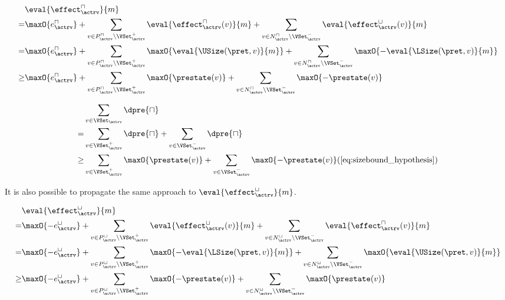 \begin{equation} \label{eq:input_rv_reduction_upper}
  \begin{split}
  & \eval{\effect^\sqcap_\actrv}{m} \\
  = & \maxO{e^{\sqcap}_\actrv}
    + \sum_{v \in P_\actrv^\sqcap \setminus \VSet^+_\actrv} \eval{\effect^\sqcap_\actrv(v)}{m}
    + \sum_{v \in N_\actrv^\sqcap \setminus \VSet^-_\actrv} \eval{\effect^\sqcup_\actrv(v)}{m} \\
  = & \maxO{e^{\sqcap}_\actrv}
    + \sum_{v \in P_\actrv^\sqcap \setminus \VSet^+_\actrv} \maxO{\eval{\USize(\pret, v)}{m}}
    + \sum_{v \in N_\actrv^\sqcap \setminus \VSet^-_\actrv} \maxO{-\eval{\LSize(\pret, v)}{m}} \\
  \geq & \maxO{e^{\sqcap}_\actrv}
    + \sum_{v \in P_\actrv^\sqcap \setminus \VSet^+_\actrv} \maxO{\prestate(v)}
    + \sum_{v \in N_\actrv^\sqcap \setminus \VSet^-_\actrv} \maxO{-\prestate(v)} \\
  \end{split}
\end{equation}

\begin{equation} \label{eq:d_upper_reduction}
  \begin{split} 
  & \sum_{v \in \VSet_\actrv} \dpre{\sqcap} \\
  = & \sum_{v \in \VSet^+_\actrv} \dpre{\sqcap} + \sum_{v \in \VSet^-_\actrv} \dpre{\sqcap} \\
  \geq & \sum_{v \in \VSet^+_\actrv} \maxO{\prestate(v)} + \sum_{v \in \VSet^-_\actrv} \maxO{-\prestate(v)} (\ref{eq:sizebound_hypothesis}) \\
  \end{split}      
\end{equation}

It is also possible to propagate the same approach to $\eval{\effect^\sqcup_\actrv}{m}$.

\begin{equation} \label{eq:input_rv_reduction_lower}
  \begin{split}
  & \eval{\effect^\sqcup_\actrv}{m} \\
  = & \maxO{-e^{\sqcup}_\actrv}
    + \sum_{v \in P_\actrv^\sqcup \setminus \VSet^+_\actrv} \eval{\effect^\sqcup_\actrv(v)}{m}
    + \sum_{v \in N_\actrv^\sqcup \setminus \VSet^-_\actrv} \eval{\effect^\sqcap_\actrv(v)}{m} \\
  = & \maxO{-e^{\sqcup}_\actrv}
    + \sum_{v \in P_\actrv^\sqcup \setminus \VSet^+_\actrv} \maxO{-\eval{\LSize(\pret, v)}{m}}
    + \sum_{v \in N_\actrv^\sqcup \setminus \VSet^-_\actrv} \maxO{\eval{\USize(\pret, v)}{m}} \\
  \geq & \maxO{-e^{\sqcup}_\actrv}
    + \sum_{v \in P_\actrv^\sqcup \setminus \VSet^+_\actrv} \maxO{-\prestate(v)}
    + \sum_{v \in N_\actrv^\sqcup \setminus \VSet^-_\actrv} \maxO{\prestate(v)} \\
  \end{split}
\end{equation}


